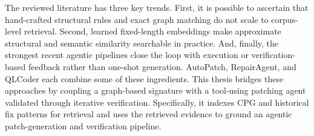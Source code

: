 The reviewed literature has three key trends.
First, it is possible to ascertain that hand-crafted structural rules and exact graph matching do not scale to corpus-level retrieval.
Second, learned fixed-length embeddings make approximate structural and semantic similarity searchable in practice.
And, finally, the strongest recent agentic pipelines close the loop with execution or verification-based feedback rather than one-shot generation. 
AutoPatch, RepairAgent, and QLCoder each combine some of these ingredients. 
This thesis bridges these approaches by coupling a graph-based signature with a tool-using patching agent validated through iterative verification. 
Specifically, it indexes CPG and historical fix patterns for retrieval and uses the retrieved evidence to ground an agentic patch-generation and verification pipeline.

